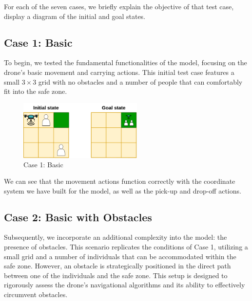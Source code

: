 \documentclass{article}
\begin{document}
For each of the seven cases, we briefly explain the objective of that test case, display a diagram of the initial and goal states.


\subsection{Case 1: Basic}

To begin, we tested the fundamental functionalities of the model, focusing on the drone's basic movement and carrying actions. This initial test case features a small \(3 \times 3\) grid with no obstacles and a number of people that can comfortably fit into the safe zone.

\begin{figure}[ht]
    \centering
    \includegraphics[width=0.55\textwidth]{assets/problem-1-basic.drawio.png}
    \caption{Case 1: Basic}
    \label{fig:initial-state}
\end{figure}
\FloatBarrier

We can see that the movement actions function correctly with the coordinate system we have built for the model, as well as the pick-up and drop-off actions.

\subsection{Case 2: Basic with Obstacles}

Subsequently, we incorporate an additional complexity into the model: the presence of obstacles. This scenario replicates the conditions of Case 1, utilizing a small grid and a number of individuals that can be accommodated within the safe zone. However, an obstacle is strategically positioned in the direct path between one of the individuals and the safe zone. This setup is designed to rigorously assess the drone's navigational algorithms and its ability to effectively circumvent obstacles.
\end{document}
